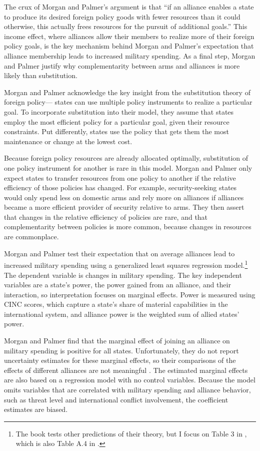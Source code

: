 \documentclass[12pt]{article}
\begin{document}
The crux of Morgan and Palmer's argument is that ``if an alliance enables a state to produce its desired foreign policy goods with fewer resources than it could otherwise, this actually frees resources for the pursuit of additional goals.''
This income effect, where alliances allow their members to realize more of their foreign policy goals, is the key mechanism behind Morgan and Palmer's expectation that alliance membership leads to increased military spending. 
As a final step, Morgan and Palmer justify why complementarity between arms and alliances is more likely than substitution. 


Morgan and Palmer acknowledge the key insight from the substitution theory of foreign policy--- states can use multiple policy instruments to realize a particular goal. 
To incorporate substitution into their model, they assume that states employ the most efficient policy for a particular goal, given their resource constraints. 
Put differently, states use the policy that gets them the most maintenance or change at the lowest cost.


Because foreign policy resources are already allocated optimally, substitution of one policy instrument for another is rare in this model. 
Morgan and Palmer only expect states to transfer resources from one policy to another if the relative efficiency of those policies has changed. 
For example, security-seeking states would only spend less on domestic arms and rely more on alliances if alliances became a more efficient provider of security relative to arms. 
They then assert that changes in the relative efficiency of policies are rare, and that complementarity between policies is more common, because changes in resources are commonplace. 


Morgan and Palmer test their expectation that on average alliances lead to increased military spending using a generalized least squares regression model.\footnote{The book tests other predictions of their theory, but I focus on Table 3 in \citet{MorganPalmer2003}, which is also Table A.4 in \citet{MorganPalmer2006}.}
The dependent variable is changes in military spending.
The key independent variables are a state's power, the power gained from an alliance, and their interaction, so interpretation focuses on marginal effects. 
Power is measured using CINC scores, which capture a state's share of material capabilities in the international system, and alliance power is the weighted sum of allied states' power. 

Morgan and Palmer find that the marginal effect of joining an alliance on military spending is positive for all states. 
Unfortunately, they do not report uncertainty estimates for these marginal effects, so their comparisons of the effects of different alliances are not meaningful \citep{BramborClarkGolder2006}. 
The estimated marginal effects are also based on a regression model with no control variables.
Because the model omits variables that are correlated with military spending and alliance behavior, such as threat level and international conflict involvement, the coefficient estimates are biased. 
\end{document}
